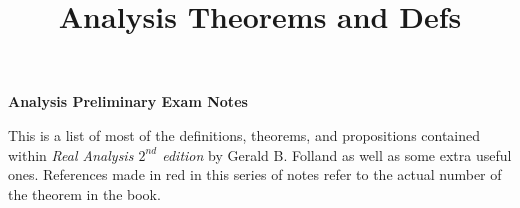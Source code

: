 
\title{Analysis Theorems and Defs}





\begin{center}
\textbf{\Large Analysis Preliminary Exam Notes}
\end{center}

This is a list of most of the definitions, theorems, and propositions contained within \textit{Real Analysis $2^{nd}$ edition} by Gerald B. Folland as well as some extra useful ones. References made in red in this series of notes refer to the actual number of the theorem in the book.\\

\tableofcontents
\newpage













